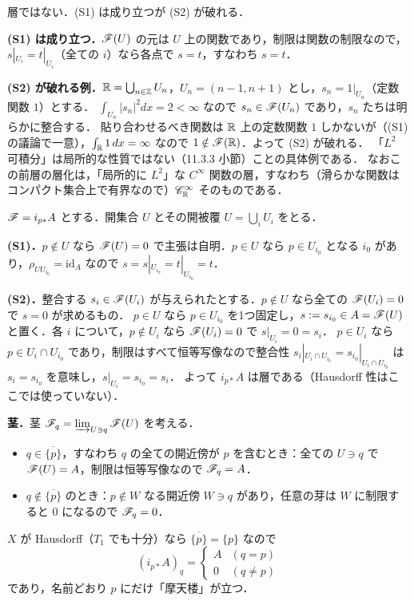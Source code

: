 層ではない．(S1) は成り立つが (S2) が破れる．

\textbf{(S1) は成り立つ．}$\mathscr{F}(U)$ の元は $U$ 上の関数であり，制限は関数の制限なので，$s|_{U_i}=t|_{U_i}$（全ての $i$）なら各点で $s=t$，すなわち $s=t$．

\textbf{(S2) が破れる例．}$\mathbb{R}=\bigcup_{n\in\mathbb{Z}}U_n$，$U_n=(n-1,n+1)$ とし，$s_n=1|_{U_n}$（定数関数 $1$）とする．
$\int_{U_n}|s_n|^2dx=2<\infty$ なので $s_n\in\mathscr{F}(U_n)$ であり，$s_n$ たちは明らかに整合する．
貼り合わせるべき関数は $\mathbb{R}$ 上の定数関数 $1$ しかないが（(S1) の議論で一意），$\int_{\mathbb{R}} 1\,dx=\infty$ なので $1\notin\mathscr{F}(\mathbb{R})$．よって (S2) が破れる．
「$L^2$ 可積分」は局所的な性質ではない（11.3.3 小節）ことの具体例である．
なおこの前層の層化は，「局所的に $L^2$」な $C^\infty$ 関数の層，すなわち（滑らかな関数はコンパクト集合上で有界なので）$\mathscr{C}^\infty_{\mathbb{R}}$ そのものである．

$\mathscr{F}=i_{p*}A$ とする．開集合 $U$ とその開被覆 $U=\bigcup_iU_i$ をとる．

\textbf{(S1)．}$p\notin U$ なら $\mathscr{F}(U)=0$ で主張は自明．$p\in U$ なら $p\in U_{i_0}$ となる $i_0$ があり，$\rho_{UU_{i_0}}=\mathrm{id}_A$ なので $s=s|_{U_{i_0}}=t|_{U_{i_0}}=t$．

\textbf{(S2)．}整合する $s_i\in\mathscr{F}(U_i)$ が与えられたとする．$p\notin U$ なら全ての $\mathscr{F}(U_i)=0$ で $s=0$ が求めるもの．
$p\in U$ なら $p\in U_{i_0}$ を1つ固定し，$s:=s_{i_0}\in A=\mathscr{F}(U)$ と置く．各 $i$ について，$p\notin U_i$ なら $\mathscr{F}(U_i)=0$ で $s|_{U_i}=0=s_i$．
$p\in U_i$ なら $p\in U_i\cap U_{i_0}$ であり，制限はすべて恒等写像なので整合性 $s_i|_{U_i\cap U_{i_0}}=s_{i_0}|_{U_i\cap U_{i_0}}$ は $s_i=s_{i_0}$ を意味し，$s|_{U_i}=s_{i_0}=s_i$．
よって $i_{p*}A$ は層である（Hausdorff 性はここでは使っていない）．

\textbf{茎．}茎 $\mathscr{F}_q=\varinjlim_{U\ni q}\mathscr{F}(U)$ を考える．
\begin{itemize}
  \item $q\in\overline{\{p\}}$，すなわち $q$ の全ての開近傍が $p$ を含むとき：全ての $U\ni q$ で $\mathscr{F}(U)=A$，制限は恒等写像なので $\mathscr{F}_q=A$．
  \item $q\notin\overline{\{p\}}$ のとき：$p\notin W$ なる開近傍 $W\ni q$ があり，任意の芽は $W$ に制限すると $0$ になるので $\mathscr{F}_q=0$．
\end{itemize}
$X$ が Hausdorff（$T_1$ でも十分）なら $\overline{\{p\}}=\{p\}$ なので
\[
  (i_{p*}A)_q=\begin{cases}A&(q=p)\\0&(q\neq p)\end{cases}
\]
であり，名前どおり $p$ にだけ「摩天楼」が立つ．

